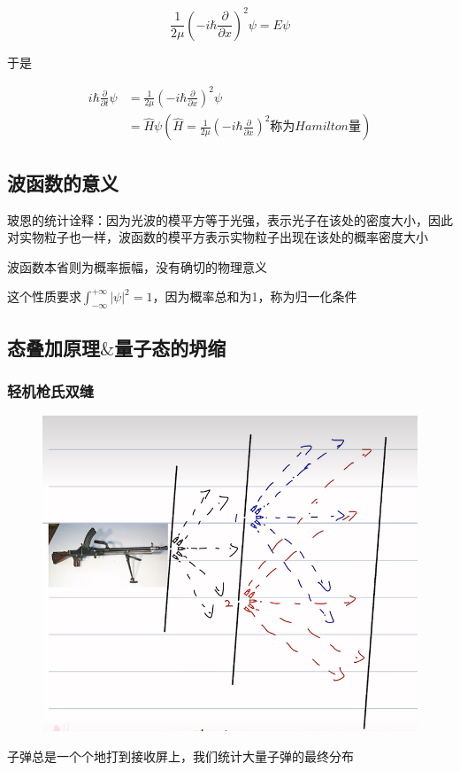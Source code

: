 \documentclass[lang=cn,15pt]{elegantbook}
\begin{document}
\begin{equation}
	\frac{1}{2\mu}\left( -i\hbar \frac{\partial}{\partial x} \right) ^2\psi =E\psi 
\end{equation}

于是

\begin{equation}
	\begin{split}
		i\hbar \frac{\partial}{\partial t}\psi &=\frac{1}{2\mu}\left( -i\hbar \frac{\partial}{\partial x} \right) ^2\psi 
		\\
		&=\hat{H}\psi \left( \hat{H}=\frac{1}{2\mu}\left( -i\hbar \frac{\partial}{\partial x} \right) ^2\text{称为}Hamilton\text{量} \right) 
	\end{split}
\end{equation}
\subsection{波函数的意义}
玻恩的统计诠释：因为光波的模平方等于光强，表示光子在该处的密度大小，因此对实物粒子也一样，波函数的模平方表示实物粒子出现在该处的概率密度大小

波函数本省则为概率振幅，没有确切的物理意义

这个性质要求$\int_{-\infty}^{+\infty}{|\psi |^2}=1$，因为概率总和为1，称为归一化条件
\subsection{态叠加原理$\&$量子态的坍缩}
\subsubsection{轻机枪氏双缝}
\begin{figure}[H]
	\centering
	\includegraphics[width=0.7\linewidth]{figure/screenshot004}
\end{figure}
子弹总是一个个地打到接收屏上，我们统计大量子弹的最终分布
\end{document}

